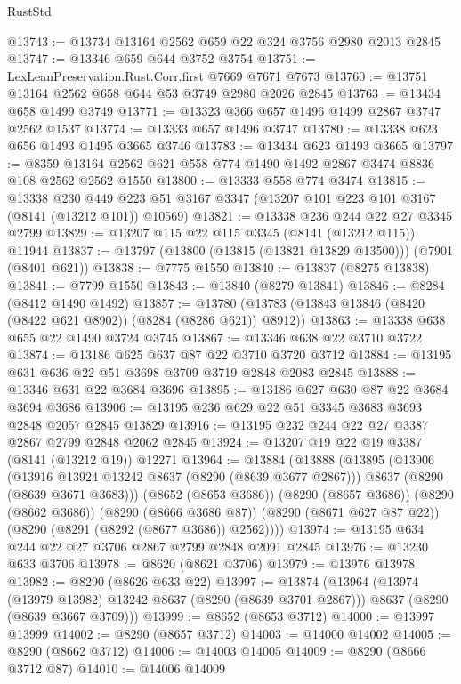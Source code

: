 \begin{lexlean}{RustStd}
\begin{coremodule}
@13743 := @13734 @13164 @2562 @659 @22 @324 @3756 @2980 @2013 @2845
@13747 := @13346 @659 @644 @3752 @3754
@13751 := LexLeanPreservation.Rust.Corr.first @7669 @7671 @7673
@13760 := @13751 @13164 @2562 @658 @644 @53 @3749 @2980 @2026 @2845
@13763 := @13434 @658 @1499 @3749
@13771 := @13323 @366 @657 @1496 @1499 @2867 @3747 @2562 @1537
@13774 := @13333 @657 @1496 @3747
@13780 := @13338 @623 @656 @1493 @1495 @3665 @3746
@13783 := @13434 @623 @1493 @3665
@13797 := @8359 @13164 @2562 @621 @558 @774 @1490 @1492 @2867 @3474 @8836 @108 @2562 @2562 @1550
@13800 := @13333 @558 @774 @3474
@13815 := @13338
    @230
    @449
    @223
    @51
    @3167
    @3347
    (@13207 @101 @223 @101 @3167 (@8141 (@13212 @101)) @10569)
@13821 := @13338 @236 @244 @22 @27 @3345 @2799
@13829 := @13207 @115 @22 @115 @3345 (@8141 (@13212 @115)) @11944
@13837 := @13797 (@13800 (@13815 (@13821 @13829 @13500))) (@7901 (@8401 @621))
@13838 := @7775 @1550
@13840 := @13837 (@8275 @13838)
@13841 := @7799 @1550
@13843 := @13840 (@8279 @13841)
@13846 := @8284 (@8412 @1490 @1492)
@13857 := @13780 (@13783 (@13843 @13846 (@8420 (@8422 @621 @8902)) (@8284 (@8286 @621)) @8912))
@13863 := @13338 @638 @655 @22 @1490 @3724 @3745
@13867 := @13346 @638 @22 @3710 @3722
@13874 := @13186 @625 @637 @87 @22 @3710 @3720 @3712
@13884 := @13195 @631 @636 @22 @51 @3698 @3709 @3719 @2848 @2083 @2845
@13888 := @13346 @631 @22 @3684 @3696
@13895 := @13186 @627 @630 @87 @22 @3684 @3694 @3686
@13906 := @13195 @236 @629 @22 @51 @3345 @3683 @3693 @2848 @2057 @2845 @13829
@13916 := @13195 @232 @244 @22 @27 @3387 @2867 @2799 @2848 @2062 @2845
@13924 := @13207 @19 @22 @19 @3387 (@8141 (@13212 @19)) @12271
@13964 := @13884
    (@13888
      (@13895
        (@13906
          (@13916 @13924 @13242 @8637 (@8290 (@8639 @3677 @2867)))
          @8637
          (@8290 (@8639 @3671 @3683)))
        (@8652 (@8653 @3686))
        (@8290 (@8657 @3686))
        (@8290 (@8662 @3686))
        (@8290 (@8666 @3686 @87))
        (@8290 (@8671 @627 @87 @22))
        (@8290 (@8291 (@8292 (@8677 @3686)) @2562))))
@13974 := @13195 @634 @244 @22 @27 @3706 @2867 @2799 @2848 @2091 @2845
@13976 := @13230 @633 @3706
@13978 := @8620 (@8621 @3706)
@13979 := @13976 @13978
@13982 := @8290 (@8626 @633 @22)
@13997 := @13874
    (@13964
      (@13974 (@13979 @13982) @13242 @8637 (@8290 (@8639 @3701 @2867)))
      @8637
      (@8290 (@8639 @3667 @3709)))
@13999 := @8652 (@8653 @3712)
@14000 := @13997 @13999
@14002 := @8290 (@8657 @3712)
@14003 := @14000 @14002
@14005 := @8290 (@8662 @3712)
@14006 := @14003 @14005
@14009 := @8290 (@8666 @3712 @87)
@14010 := @14006 @14009

\end{coremodule}
\end{lexlean}
